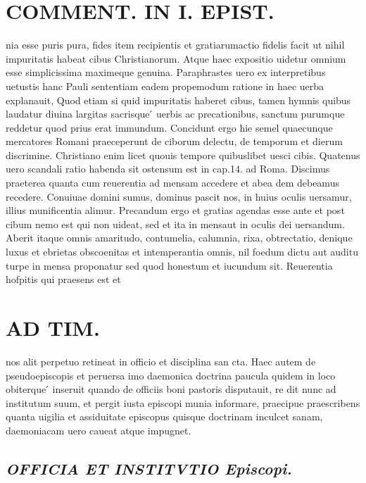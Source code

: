 \documentclass{article}
\begin{document}
\begin{pages}
\section*{COMMENT. IN I. EPIST. }\pstart nia esse puris pura, fides item recipientis et gratiarumactio fidelis facit ut nihil impuritatis habeat cibus Christianorum. Atque haec expositio uidetur omnium esse simplicissima maximeque genuina. Paraphrastes uero ex interpretibus uetustis hanc Pauli sententiam eadem propemodum ratione in haec uerba explanauit, Quod etiam si quid impuritatis haberet cibus, tamen hymnis quibus laudatur diuina largitas sacrisque ́ uerbis ac precationibus, sanctum purumque reddetur quod prius erat immundum. Concidunt ergo hie semel quaecunque mercatores Romani praeceperunt de ciborum delectu, de temporum et dierum discrimine. Christiano enim licet quouis tempore quibuslibet uesci cibis. Quatenus uero scandali ratio habenda sit ostensum est in cap.14. ad Roma. Discimus praeterea quanta cum reuerentia ad mensam accedere et abea dem debeamus recedere. Conuiuae domini sumus, dominus pascit nos, in huius oculis uersamur, illius munificentia alimur. Precandum ergo et gratias agendas esse ante et post cibum nemo est qui non uideat, sed et ita in mensaut in oculis dei uersandum. Aberit itaque omnis amaritudo, contumelia, calumnia, rixa, obtrectatio, denique luxus et ebrietas obscoenitas et intemperantia omnis, nil foedum dictu aut auditu turpe in mensa proponatur sed quod honestum et iucundum sit. Reuerentia hofpitis qui praesens est et  \pend
\section*{AD TIM. }
\marginpar{[ p.141 ]}\pstart nos alit perpetuo retineat in officio et disciplina san cta. Haec autem de pseudoepiscopis et peruersa imo daemonica doctrina paucula quidem in loco obiterque ́ inseruit quando de officiis boni pastoris disputauit, re dit nunc ad institutum suum, et pergit iusta episcopi munia informare, praecipue praescribens quanta uigilia et assiduitate episcopus quisque doctrinam inculcet sanam, daemoniacam uero caueat atque impugnet.  \pend
{}
{}
\subsection*{\textit{OFFICIA ET INSTITVTIO Episcopi. }}
{}

\end{pages}
\end{document}
